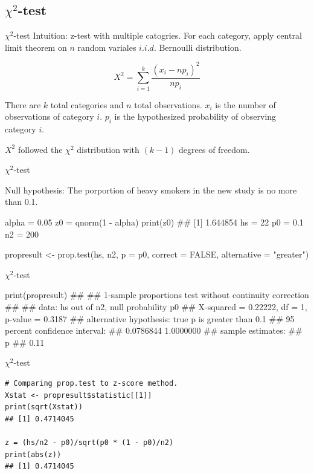 \documentclass[12pt, t, xcolor=dvipsnames]{beamer}
\begin{document}
\subsection{\texorpdfstring{$\chi^2$}{chi-squared}-test}

\begin{frame}[fragile]{$\chi^2$-test}
Intuition: z-test with multiple catogries. For each category, apply central limit theorem on $n$ random variales $i.i.d.$ Bernoulli distribution.

$$X^2 = \sum_{i=1}^{k}\frac{(x_i - n p_i)^2}{n p_i}$$

There are $k$ total categories and $n$ total observations. $x_i$ is the number of observations of category $i$. $p_i$ is the hypothesized probability of observing category $i$. 

$X^{2}$ followed the $\chi^{2}$ distribution with $(k-1)$ degrees of freedom.
 

\end{frame}

\begin{frame}[fragile]{$\chi^2$-test}

Null hypothesis: The porportion of heavy smokers in the new study is no more than 0.1. 

\begin{Rcode}
alpha = 0.05
z0 = qnorm(1 - alpha)
print(z0)
## [1] 1.644854
hs = 22
p0 = 0.1
n2 = 200

propresult <- prop.test(hs, n2, p = p0, correct = FALSE, 
                        alternative = "greater")
\end{Rcode}
\end{frame}

\begin{frame}[fragile]{$\chi^2$-test}

\begin{Rcode}
print(propresult)
## 
##  1-sample proportions test without continuity correction
## 
## data:  hs out of n2, null probability p0
## X-squared = 0.22222, df = 1, p-value = 0.3187
## alternative hypothesis: true p is greater than 0.1
## 95 percent confidence interval:
##  0.0786844 1.0000000
## sample estimates:
##    p 
## 0.11
\end{Rcode}
\end{frame}

\begin{frame}[fragile]{$\chi^2$-test}

\begin{verbatim}
# Comparing prop.test to z-score method.
Xstat <- propresult$statistic[[1]]
print(sqrt(Xstat))
## [1] 0.4714045

z = (hs/n2 - p0)/sqrt(p0 * (1 - p0)/n2)
print(abs(z))
## [1] 0.4714045
\end{verbatim}

\end{frame}
\end{document}
